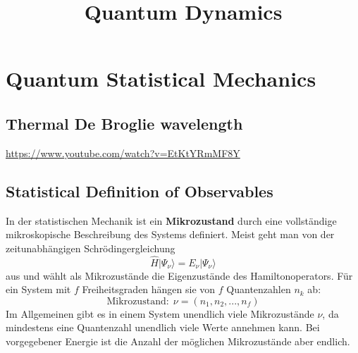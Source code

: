 \documentclass[9pt]{report}
\title{\Huge\textbf{Quantum Dynamics}}
\date{}
\author{}
\begin{document}
\maketitle


\tableofcontents















\newpage
\chapter{Quantum Statistical Mechanics}


\section{Thermal De Broglie wavelength}
\url{https://www.youtube.com/watch?v=EtKtYRmMF8Y}


\section{Statistical Definition of Observables}
In der statistischen Mechanik ist ein \textbf{Mikrozustand} durch eine vollständige mikroskopische Beschreibung des Systems definiert. Meist geht man von der zeitunabhängigen Schrödingergleichung
\begin{equation}
\hat{H}|\Psi_{\nu}\rangle = E_{\nu}|\Psi_{\nu}\rangle
\end{equation}
aus und wählt als Mikrozustände die Eigenzustände des Hamiltonoperators. Für ein System mit $f$ Freiheitsgraden hängen sie von $f$ Quantenzahlen $n_k$ ab:
\begin{equation}
\mathrm{Mikrozustand}:\;\nu=(n_1,n_2,...,n_f)
\end{equation}
Im Allgemeinen gibt es in einem System unendlich viele Mikrozustände $\nu$, da mindestens eine Quantenzahl unendlich viele Werte annehmen kann. Bei vorgegebener Energie ist die Anzahl der möglichen Mikrozustände aber endlich.
\end{document}
